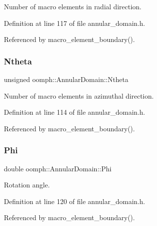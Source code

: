 Number of macro elements in radial direction. 



Definition at line 117 of file annular\+\_\+domain.\+h.



Referenced by macro\+\_\+element\+\_\+boundary().

\mbox{\label{classoomph_1_1AnnularDomain_a42f197d2b806a961395f905d947b3e6e}} 
\subsubsection{\texorpdfstring{Ntheta}{Ntheta}}
{\footnotesize\ttfamily unsigned oomph\+::\+Annular\+Domain\+::\+Ntheta\hspace{0.3cm}{\ttfamily [private]}}



Number of macro elements in azimuthal direction. 



Definition at line 114 of file annular\+\_\+domain.\+h.



Referenced by macro\+\_\+element\+\_\+boundary().

\mbox{\label{classoomph_1_1AnnularDomain_a0280549bd7a88cabb84a7223ed114040}} 
\subsubsection{\texorpdfstring{Phi}{Phi}}
{\footnotesize\ttfamily double oomph\+::\+Annular\+Domain\+::\+Phi\hspace{0.3cm}{\ttfamily [private]}}



Rotation angle. 



Definition at line 120 of file annular\+\_\+domain.\+h.



Referenced by macro\+\_\+element\+\_\+boundary().

\mbox{\label{classoomph_1_1AnnularDomain_a34008644354ffc3e7f48505557d95755}} 
